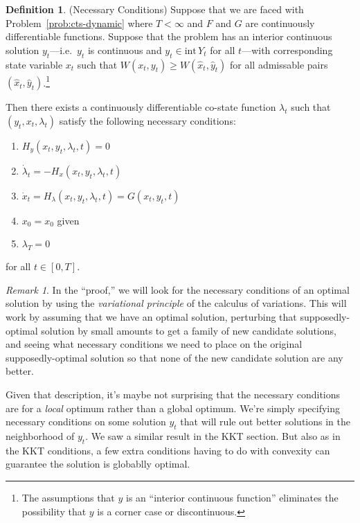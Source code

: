 \documentclass[12pt]{article}
\numberwithin{equation}{section} %
\theoremstyle{plain}
\theoremstyle{definition}
\newtheorem{defn}[thm]{Definition}
\theoremstyle{remark}
\newtheorem*{rmk}{Remark}
\begin{document}
\begin{defn}{(Necessary Conditions)}
Suppose that we are faced with Problem~\ref{prob:cts-dynamic} where
$T<\infty$ and $F$ and $G$ are continuously differentiable functions.
Suppose that the problem has an interior continuous solution
$y_t$---i.e.\ $y_t$ is continuous and $y_t\in \text{int} \, Y_t$ for all
$t$---with corresponding state variable $x_t$ such that $W(x_t,y_t) \geq
W(\hat{x}_t,\hat{y}_t)$ for all admissable pairs
$(\hat{x}_t,\hat{y}_t)$.\footnote{%
The assumptions that $y$ is an ``interior continuous function''
eliminates the possibility that $y$ is a corner case or discontinuous.
}

Then there exists a continuously differentiable co-state function
$\lambda_t$ such that $(y_t,x_t,\lambda_t)$ satisfy the following
necessary conditions:
\begin{enumerate}
  \item $H_y (x_t,y_t,\lambda_t,t) = 0$
  \item $\dot{\lambda}_t = - H_x(x_t, y_t, \lambda_t, t)$
  \item $\dot{x}_t = H_\lambda(x_t,y_t,\lambda_t,t) = G(x_t, y_t, t)$
  \item $x_0=x_0$ given
  \item $\lambda_T=0$
\end{enumerate}
for all $t\in[0,T]$.
\end{defn}
\begin{rmk}
In the ``proof,'' we will look for the necessary conditions of an
optimal solution by using the \emph{variational principle} of the
calculus of variations.  This will work by assuming that we have an
optimal solution, perturbing that supposedly-optimal solution by small
amounts to get a family of new candidate solutions, and seeing what
necessary conditions we need to place on the original supposedly-optimal
solution so that none of the new candidate solution are any better.

Given that description, it's maybe not surprising that the necessary
conditions are for a \emph{local} optimum rather than a global optimum.
We're simply specifying necessary conditions on some solution $y_t$ that
will rule out better solutions in the neighborhood of $y_t$. We saw a
similar result in the KKT section. But also as in the KKT conditions, a
few extra conditions having to do with convexity can guarantee the
solution is globablly optimal.
\end{rmk}
\end{document}
